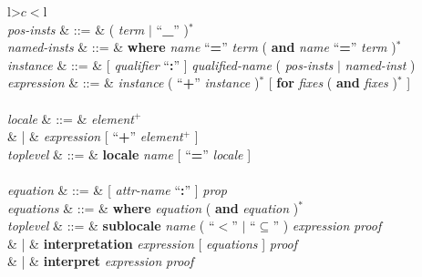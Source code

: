 \begin{isabellebody}
\begin{isamarkuptext}
\begin{table}
\begin{center}
\begin{tabular}{l>$c<$l}
   \\

  \textit{pos-insts} & ::=
  & ( \textit{term} $|$ ``\textbf{\_}'' )$^*$ \\
  \textit{named-insts} & ::=
  & \textbf{where} \textit{name} ``\textbf{=}'' \textit{term}
  ( \textbf{and} \textit{name} ``\textbf{=}'' \textit{term} )$^*$ \\
  \textit{instance} & ::=
  & [ \textit{qualifier} ``\textbf{:}'' ]
    \textit{qualified-name} ( \textit{pos-insts} $|$ \textit{named-inst} ) \\
  \textit{expression}  & ::= 
  & \textit{instance} ( ``\textbf{+}'' \textit{instance} )$^*$
    [ \textbf{for} \textit{fixes} ( \textbf{and} \textit{fixes} )$^*$ ] \\[2ex]

   \\

  \textit{locale} & ::=
  & \textit{element}$^+$ \\
  & | & \textit{expression} [ ``\textbf{+}'' \textit{element}$^+$ ] \\
  \textit{toplevel} & ::=
  & \textbf{locale} \textit{name} [ ``\textbf{=}''
    \textit{locale} ] \\[2ex]

   \\

  \textit{equation} & ::= & [ \textit{attr-name} ``\textbf{:}'' ]
    \textit{prop} \\
  \textit{equations} & ::= &  \textbf{where} \textit{equation} ( \textbf{and}
    \textit{equation} )$^*$  \\
  \textit{toplevel} & ::=
  & \textbf{sublocale} \textit{name} ( ``$<$'' $|$
    ``$\subseteq$'' ) \textit{expression} \textit{proof} \\
  & |
  & \textbf{interpretation}
    \textit{expression} [ \textit{equations} ] \textit{proof} \\
  & |
  & \textbf{interpret}
    \textit{expression} \textit{proof} \\[2ex]

   \\


\end{tabular}
\end{center}
\end{table}
\end{isamarkuptext}
\end{isabellebody}

